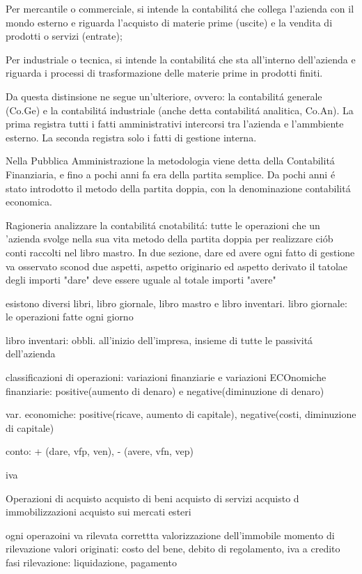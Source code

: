 \documentclass{article}
\begin{document}
Per mercantile o commerciale, si intende la contabilit\'a che collega l'azienda con il mondo esterno e riguarda l'acquisto di materie prime (uscite) e la vendita di prodotti o servizi (entrate);

Per industriale o tecnica, si intende la contabilit\'a che sta all'interno dell'azienda e riguarda i processi di trasformazione delle materie prime in prodotti finiti.

Da questa distinsione ne segue un'ulteriore, ovvero: la contabilit\'a generale (Co.Ge) e la contabilit\'a industriale (anche detta contabilit\'a analitica, Co.An).
La prima registra tutti i fatti amministrativi intercorsi tra l'azienda e l'ammbiente esterno. La seconda registra solo i fatti di gestione interna.

Nella Pubblica Amministrazione la metodologia viene detta della Contabilit\'a Finanziaria, e fino a pochi anni fa era della partita semplice. Da pochi anni \'e stato introdotto il metodo della partita doppia, con la denominazione contabilit\'a economica.

Ragioneria analizzare la contabilit\'a 
cnotabilit\'a: tutte le operazioni che un 'azienda svolge nella sua vita
metodo della partita doppia per realizzare ci\'ob
conti raccolti nel libro mastro. In due sezione, dare ed avere
ogni fatto di gestione va osservato sconod due aspetti, aspetto originario ed aspetto derivato
il tatolae degli importi "dare" deve essere uguale al totale importi "avere"

esistono diversi libri, libro giornale, libro mastro e libro inventari.
libro giornale: le operazioni fatte ogni giorno

libro inventari: obbli. all'inizio dell'impresa, insieme di tutte le passivit\'a dell'azienda

classificazioni di operazioni:
variazioni finanziarie e variazioni ECOnomiche
finanziarie: positive(aumento di denaro) e negative(diminuzione di denaro)

var. economiche: positive(ricave, aumento di capitale), negative(costi, diminuzione di capitale)

conto: + (dare, vfp, ven), - (avere, vfn, vep)

iva

Operazioni di acquisto
acquisto di beni
acquisto di servizi
acquisto d immobilizzazioni
acquisto sui mercati esteri

ogni operazoini va rilevata
correttta valorizzazione dell'immobile
momento di rilevazione
valori originati: costo del bene, debito di regolamento, iva a credito
fasi rilevazione: liquidazione, pagamento
\end{document}
